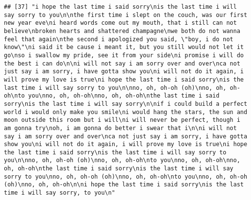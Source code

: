 \documentclass[]{article}
\begin{document}
\begin{verbatim}
## [37] "i hope the last time i said sorry\nis the last time i will say sorry to you\n\nthe first time i slept on the couch, was our first new year eve\ni heard words come out my mouth, that i still can not believe\nbroken hearts and shattered champagne\nwe both do not wanna feel that again\nthe second i apologized you said, \"boy, i do not know\"\ni said it be cause i meant it, but you still would not let it go\nso i swallow my pride, see it from your side\ni promise i will do the best i can do\n\ni will not say i am sorry over and over\nca not just say i am sorry, i have gotta show you\ni will not do it again, i will prove my love is true\ni hope the last time i said sorry\nis the last time i will say sorry to you\n\nno, oh, oh-oh (oh)\nno, oh, oh-oh\nto you\nno, oh, oh-oh\nno, oh, oh-oh\nthe last time i said sorry\nis the last time i will say sorry\n\nif i could build a perfect world i would only make you smile\ni would hang the stars, the sun and moon outside this room but i will\ni will never be perfect, though i am gonna try\noh, i am gonna do better i swear that i\n\ni will not say i am sorry over and over\nca not just say i am sorry, i have gotta show you\ni will not do it again, i will prove my love is true\ni hope the last time i said sorry\nis the last time i will say sorry to you\n\nno, oh, oh-oh (oh)\nno, oh, oh-oh\nto you\nno, oh, oh-oh\nno, oh, oh-oh\nthe last time i said sorry\nis the last time i will say sorry to you\nno, oh, oh-oh (oh)\nno, oh, oh-oh\nto you\nno, oh, oh-oh (oh)\nno, oh, oh-oh\n\ni hope the last time i said sorry\nis the last time i will say sorry, to you\n"                                                                                                                                                                                                                                                                                                                                                                                                                                                                                                                                                                                                                                                                                                                                                                                                                                                                                                                                                                                                                                                                                                                                                                                                                                                                                                         

\end{verbatim}
\end{document}

